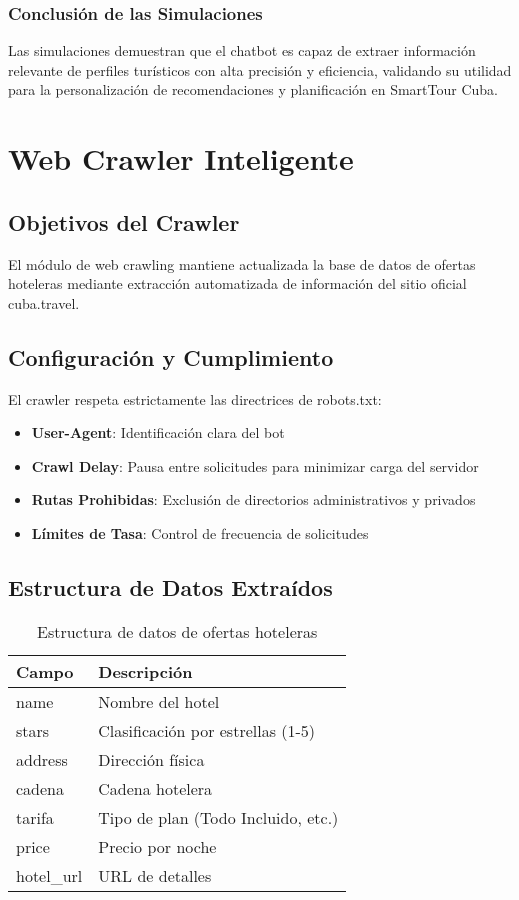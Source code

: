 \documentclass[runningheads]{llncs}
\begin{document}
\subsubsection{Conclusión de las Simulaciones}

Las simulaciones demuestran que el chatbot es capaz de extraer información relevante de perfiles turísticos con alta precisión y eficiencia, validando su utilidad para la personalización de recomendaciones y planificación en SmartTour Cuba.

\section{Web Crawler Inteligente}

\subsection{Objetivos del Crawler}

El módulo de web crawling mantiene actualizada la base de datos de ofertas hoteleras mediante extracción automatizada de información del sitio oficial cuba.travel.

\subsection{Configuración y Cumplimiento}

El crawler respeta estrictamente las directrices de robots.txt:

\begin{itemize}
\item \textbf{User-Agent}: Identificación clara del bot
\item \textbf{Crawl Delay}: Pausa entre solicitudes para minimizar carga del servidor
\item \textbf{Rutas Prohibidas}: Exclusión de directorios administrativos y privados
\item \textbf{Límites de Tasa}: Control de frecuencia de solicitudes
\end{itemize}

\subsection{Estructura de Datos Extraídos}

\begin{table}[H]
\centering
\begin{tabular}{ll}
\toprule
\textbf{Campo} & \textbf{Descripción} \\
\midrule
name & Nombre del hotel \\
stars & Clasificación por estrellas (1-5) \\
address & Dirección física \\
cadena & Cadena hotelera \\
tarifa & Tipo de plan (Todo Incluido, etc.) \\
price & Precio por noche \\
hotel\_url & URL de detalles \\
\bottomrule
\end{tabular}
\caption{Estructura de datos de ofertas hoteleras}
\end{table}
\end{document}
